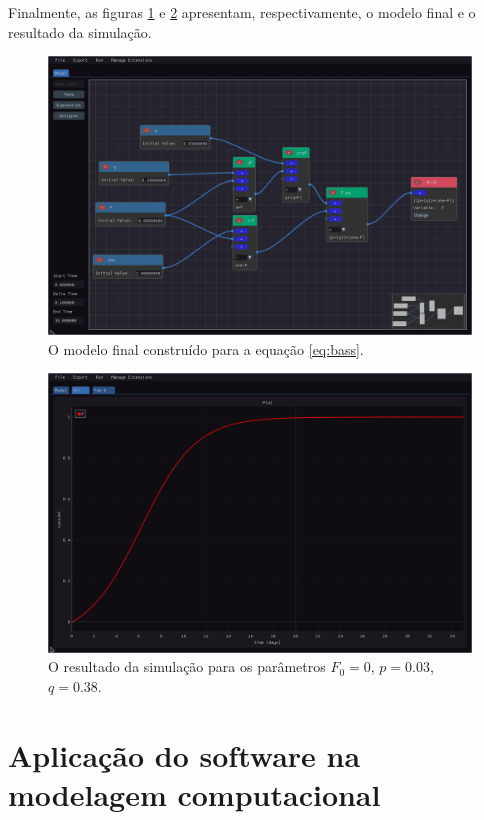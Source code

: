 \documentclass[
	12pt,				%
	openright,			%
	oneside,			%
	a4paper,			%
	main=brazil,
	english,			%
	]{ufsj-abntex2}
\begin{document}
Finalmente, as figuras \ref{fig:modelo-final} e \ref{fig:resultado} apresentam, respectivamente, o modelo final e o resultado da simulação.

\begin{figure}[h]
    \centering
    \includegraphics[width=\textwidth]{imgs/ode-designer/passo-a-passo/modelo-final.png} 
    \caption{O modelo final construído para a equação \ref{eq:bass}.}
    \label{fig:modelo-final}
\end{figure}

\begin{figure}[h]
    \centering
    \includegraphics[width=\textwidth]{imgs/ode-designer/passo-a-passo/resultado.png} 
    \caption{O resultado da simulação para os parâmetros $F_0 = 0$, $p = 0.03$, $q = 0.38$.}
    \label{fig:resultado}
\end{figure}

\chapter{Aplicação do software na modelagem computacional}
\label{chap:resultados}
\end{document}
